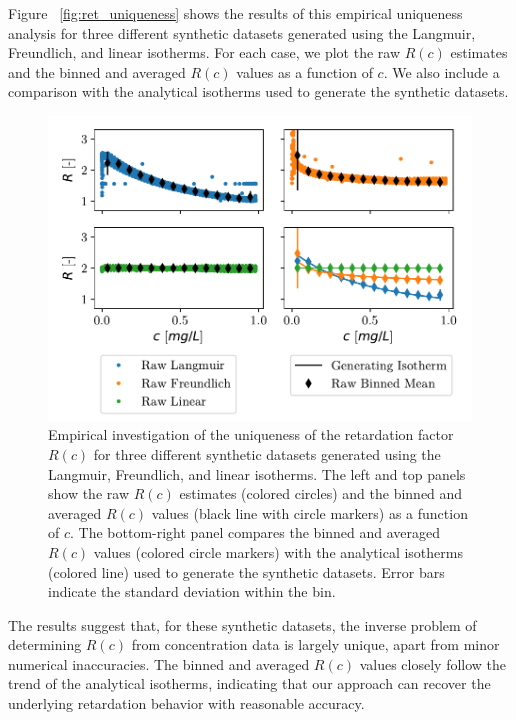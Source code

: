 Figure ~\vref{fig:ret_uniqueness} shows the results of this empirical uniqueness analysis for three different synthetic datasets generated using the Langmuir, Freundlich, and linear isotherms. For each case, we plot the raw $R(c)$ estimates and the binned and averaged $R(c)$ values as a function of $c$. We also include a comparison with the analytical isotherms used to generate the synthetic datasets.

\begin{figure}[h!]
    \centering
    \includegraphics{figs/ret_uniqueness.pdf}
    \caption{Empirical investigation of the uniqueness of the retardation factor $R(c)$ for three different synthetic datasets generated using the Langmuir, Freundlich, and linear isotherms. The left and top panels show the raw $R(c)$ estimates (colored circles) and the binned and averaged $R(c)$ values (black line with circle markers) as a function of $c$. The bottom-right panel compares the binned and averaged $R(c)$ values (colored circle markers) with the analytical isotherms (colored line) used to generate the synthetic datasets. Error bars indicate the standard deviation within the bin.}
    \label{fig:ret_uniqueness}
\end{figure}

The results suggest that, for these synthetic datasets, the inverse problem of determining $R(c)$ from concentration data is largely unique, apart from minor numerical inaccuracies. The binned and averaged $R(c)$ values closely follow the trend of the analytical isotherms, indicating that our approach can recover the underlying retardation behavior with reasonable accuracy.

